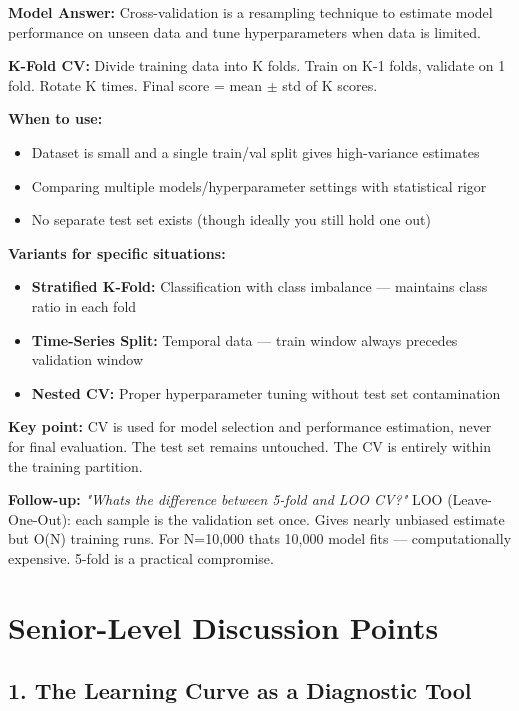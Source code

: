 \documentclass[11pt]{article}
\providecommand{\tightlist}{\setlength{\itemsep}{1pt}\setlength{\parskip}{0pt}}
\begin{document}
\textbf{Model Answer:}
Cross-validation is a resampling technique to estimate model performance on unseen data and tune hyperparameters when data is limited.

\textbf{K-Fold CV:} Divide training data into K folds. Train on K-1 folds, validate on 1 fold. Rotate K times. Final score = mean \(\pm\) std of K scores.

\textbf{When to use:}

\begin{itemize}
\tightlist
\item
  Dataset is small and a single train/val split gives high-variance estimates
\item
  Comparing multiple models/hyperparameter settings with statistical rigor
\item
  No separate test set exists (though ideally you still hold one out)
\end{itemize}

\textbf{Variants for specific situations:}

\begin{itemize}
\tightlist
\item
  \textbf{Stratified K-Fold:} Classification with class imbalance --- maintains class ratio in each fold
\item
  \textbf{Time-Series Split:} Temporal data --- train window always precedes validation window
\item
  \textbf{Nested CV:} Proper hyperparameter tuning without test set contamination
\end{itemize}

\textbf{Key point:} CV is used for model selection and performance estimation, never for final evaluation. The test set remains untouched. The CV is entirely within the training partition.

\textbf{Follow-up:} \emph{"What\textquotesingle s the difference between 5-fold and LOO CV?"}
LOO (Leave-One-Out): each sample is the validation set once. Gives nearly unbiased estimate but O(N) training runs. For N=10,000 that\textquotesingle s 10,000 model fits --- computationally expensive. 5-fold is a practical compromise.

\section{Senior-Level Discussion Points}\label{senior-level-discussion-points}

\subsection{1. The Learning Curve as a Diagnostic Tool}\label{1-the-learning-curve-as-a-diagnostic-tool}
\end{document}
